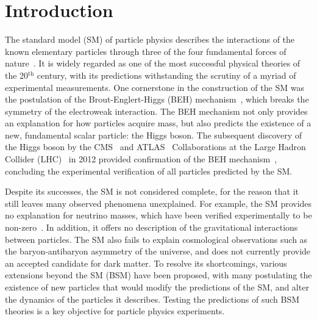 \chapter{Introduction}
\label{chap:intro}


The standard model (SM) of particle physics describes the interactions of the known elementary particles through three of the four fundamental forces of nature~\cite{Glashow,Salam,Weinberg}. It is widely regarded as one of the most successful physical theories of the 20$^{\mathrm{th}}$ century, with its predictions withstanding the scrutiny of a myriad of experimental measurements. One cornerstone in the construction of the SM was the postulation of the Brout-Englert-Higgs (BEH) mechanism~\cite{BroutEnglert,HiggsBS1,HiggsBS2,HiggsBS3,Kibble}, which breaks the symmetry of the electroweak interaction. The BEH mechanism not only provides an explanation for how particles acquire mass, but also predicts the existence of a new, fundamental scalar particle: the Higgs boson. The subsequent discovery of the Higgs boson by the CMS~\cite{CMS} and ATLAS~\cite{ATLAS} Collaborations at the Large Hadron Collider (LHC)~\cite{LHCTDR} in 2012 provided confirmation of the BEH mechanism~\cite{Aad:2012tfa,Chatrchyan:2012xdj,Chatrchyan:2013lba}, concluding the experimental verification of all particles predicted by the SM.

Despite its successes, the SM is not considered complete, for the reason that it still leaves many observed phenomena unexplained. For example, the SM provides no explanation for neutrino masses, which have been verified experimentally to be non-zero~\cite{neutrino_oscillation}. In addition, it offers no description of the gravitational interactions between particles. The SM also fails to explain cosmological observations such as the baryon-antibaryon asymmetry of the universe, and does not currently provide an accepted candidate for dark matter. To resolve its shortcomings, various extensions beyond the SM (BSM) have been proposed, with many postulating the existence of new particles that would modify the predictions of the SM, and alter the dynamics of the particles it describes. Testing the predictions of such BSM theories is a key objective for particle physics experiments.

